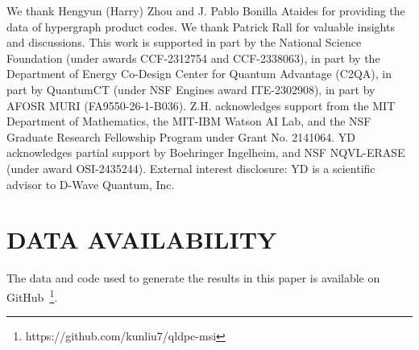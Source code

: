 \documentclass[%
 reprint,
superscriptaddress,
 amsmath,amssymb,
 aps,
prx,
floatfix,
]{revtex4-2}
\begin{document}


\begin{acknowledgments}
We thank Hengyun (Harry) Zhou and J. Pablo Bonilla Ataides for providing the data of hypergraph product codes.
We thank Patrick Rall for valuable insights and discussions.
This work is supported in part by the National Science Foundation (under awards CCF-2312754 and CCF-2338063), in part by the Department of Energy Co-Design Center for Quantum Advantage (C2QA), in part by QuantumCT (under NSF Engines award ITE-2302908), in part by AFOSR MURI (FA9550-26-1-B036).
Z.H. acknowledges support from the MIT Department of Mathematics, the MIT-IBM Watson AI Lab, and the NSF Graduate Research Fellowship Program under Grant No. 2141064.
YD acknowledges partial support by Boehringer Ingelheim, and NSF NQVL-ERASE (under award OSI-2435244). External interest disclosure: YD is a scientific advisor to D-Wave Quantum, Inc.
\end{acknowledgments}

\section*{DATA AVAILABILITY}
The data and code used to generate 
the results in this paper is available on GitHub~\footnote{https://github.com/kunliu7/qldpc-msi}.
\appendix










\end{document}
